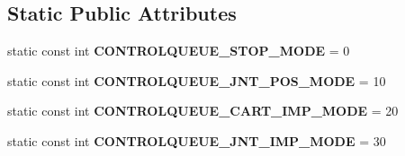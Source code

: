 \subsection*{Static Public Attributes}
\begin{DoxyCompactItemize}
\item 
\hypertarget{classkukadu_1_1ControlQueue_a1a207e4332a8b1ac5a8bf425d697570f}{static const int {\bfseries C\-O\-N\-T\-R\-O\-L\-Q\-U\-E\-U\-E\-\_\-\-S\-T\-O\-P\-\_\-\-M\-O\-D\-E} = 0}\label{classkukadu_1_1ControlQueue_a1a207e4332a8b1ac5a8bf425d697570f}

\item 
\hypertarget{classkukadu_1_1ControlQueue_a9c8511060b437868de842e7456f18018}{static const int {\bfseries C\-O\-N\-T\-R\-O\-L\-Q\-U\-E\-U\-E\-\_\-\-J\-N\-T\-\_\-\-P\-O\-S\-\_\-\-M\-O\-D\-E} = 10}\label{classkukadu_1_1ControlQueue_a9c8511060b437868de842e7456f18018}

\item 
\hypertarget{classkukadu_1_1ControlQueue_a664a52e365e9185a0aef587e331fe94f}{static const int {\bfseries C\-O\-N\-T\-R\-O\-L\-Q\-U\-E\-U\-E\-\_\-\-C\-A\-R\-T\-\_\-\-I\-M\-P\-\_\-\-M\-O\-D\-E} = 20}\label{classkukadu_1_1ControlQueue_a664a52e365e9185a0aef587e331fe94f}

\item 
\hypertarget{classkukadu_1_1ControlQueue_a8372490df9e7fbfa75afb9cfe1c0e6b4}{static const int {\bfseries C\-O\-N\-T\-R\-O\-L\-Q\-U\-E\-U\-E\-\_\-\-J\-N\-T\-\_\-\-I\-M\-P\-\_\-\-M\-O\-D\-E} = 30}\label{classkukadu_1_1ControlQueue_a8372490df9e7fbfa75afb9cfe1c0e6b4}

\end{DoxyCompactItemize}

